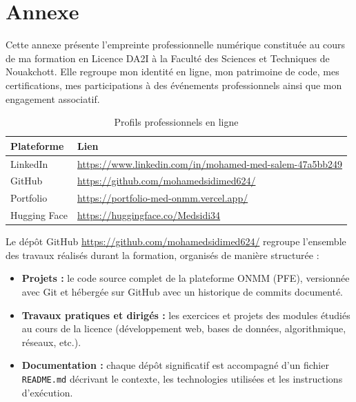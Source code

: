 ﻿\documentclass[12pt,a4paper]{report}
\begin{document}
\chapter*{Annexe}
\thispagestyle{fancy}

\renewcommand{\thefigure}{A.\arabic{figure}}
\renewcommand{\thetable}{A.\arabic{table}}
\setcounter{figure}{0}
\setcounter{table}{0}

Cette annexe présente l'empreinte professionnelle numérique constituée au cours de ma formation en
Licence DA2I à la Faculté des Sciences et Techniques de Nouakchott. Elle regroupe mon identité en ligne,
mon patrimoine de code, mes certifications, mes participations à des événements professionnels ainsi que
mon engagement associatif.

\medskip
{}
\medskip

\begin{table}[H]
\centering
\begin{tabularx}{\textwidth}{|l|X|}
\hline
\textbf{Plateforme} & \textbf{Lien} \\
\hline
LinkedIn &
\url{https://www.linkedin.com/in/mohamed-med-salem-47a5bb249} \\
\hline
GitHub &
\url{https://github.com/mohamedsidimed624/} \\
\hline
Portfolio &
\url{https://portfolio-med-onmm.vercel.app/} \\
\hline
Hugging Face &
\url{https://huggingface.co/Medsidi34} \\
\hline
\end{tabularx}
\caption{Profils professionnels en ligne}
\end{table}

\medskip
{}
\medskip

Le dépôt GitHub \url{https://github.com/mohamedsidimed624/} regroupe l'ensemble des travaux
réalisés durant la formation, organisés de manière structurée :

\begin{itemize}
    \item \textbf{Projets :} le code source complet de la plateforme ONMM (PFE), versionnée avec Git
    et hébergée sur GitHub avec un historique de commits documenté.
    \item \textbf{Travaux pratiques et dirigés :} les exercices et projets des modules étudiés au cours
    de la licence (développement web, bases de données, algorithmique, réseaux, etc.).
    \item \textbf{Documentation :} chaque dépôt significatif est accompagné d'un fichier
    \texttt{README.md} décrivant le contexte, les technologies utilisées et les instructions d'exécution.
\end{itemize}
\end{document}
